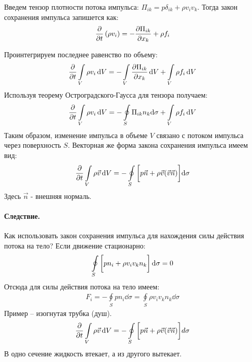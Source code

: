 Введем тензор плотности потока импульса: $ \Pi _ { i k } = p \delta _ { i k } + \rho v _ { i } v _ { k } $. Тогда закон сохранения импульса запишется как:
\begin{align*}
\pdv{t} \left( \rho v _ { i } \right) = - \frac { \partial \Pi _ { i k } } { \partial x _ { k } } + \rho f _ { i }
\end{align*}

Проинтегрируем последнее равенство по объему:
\begin{align*}
\pdv{t} \int \limits_{ V } \rho v _ { i }\dd{V} = - \int \limits_{ V } \frac { \partial \Pi _ { i k } } { \partial x _ { k } }\dd{V} + \int \limits_{ V } \rho f _ { i }\dd{V}
\end{align*}
Используя теорему Остроградского-Гаусса для тензора получаем:
\begin{align*}
\pdv{t} \int \limits_ { V } \rho v _ { i }\dd{V} = - \oint \limits_ { S } \Pi _ { i k } n _ { k } \dd \sigma + \int \limits_ { V } \rho f _ { i }\dd{V}
\end{align*}
Таким образом, изменение импульса в объеме $V$ связано с потоком импульса через поверхность $S$. Векторная же форма закона сохранения импульса имеем вид:
\begin{align*}
\pdv{t} \int \limits_ { V } \rho  \vec{v}\dd{V}  = - \oint \limits_ { S } \qty[\vphantom{\int} p \vec { n } + \rho \vec{v} ( \vec{v} \vec{n} ) ]\dd\sigma
\end{align*}
Здесь $\vec{n}$ - внешняя нормаль.

\paragraph{Следствие.} Как использовать закон сохранения импульса для нахождения силы действия потока на тело? Если движение стационарно:
\begin{align*}
\oint\limits_{ S } \left[\vphantom{\int} p n _ { i } + \rho v _ { i } v _ { k } n _ { k } \right] \dd \sigma = 0
\end{align*}
Отсюда для силы действия потока на тело имеем:
\begin{align*}
F _ { i } = - \oint \limits_ { S } p n _ { i } \dd \sigma = \oint \limits_ { S } \rho v _ { i } v _ { k } n _ { k } \dd \sigma
\end{align*}
Пример -- изогнутая трубка (душ).
\begin{align*}
\pdv{t} \int \limits_ { V } \rho  \vec{v}\dd{V}  = - \oint \limits_ { S } \qty[\vphantom{\int} p \vec { n } + \rho \vec{v} ( \vec{v} \vec{n} ) ]d \sigma
\end{align*}
В одно сечение жидкость втекает, а из другого вытекает.


